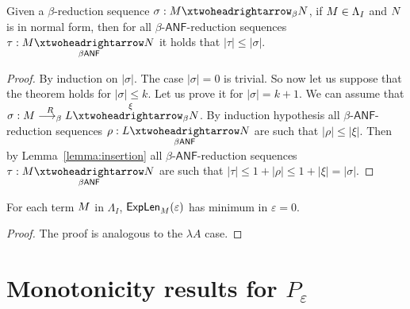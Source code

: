 \begin{theorem}\label{theorem:revstd}
	Given a $\beta$-reduction sequence
	$\sigma:\termone \redbetared{} \termtwo$, if $M\in \Lambda_I$ and $N$ is in normal form, then for all $\beta$-$\mathsf{ANF}$-reduction sequences $\tau:\termone\redbetaredanf{} \termtwo$ it holds that $|\tau|\leq |\sigma|$.
\end{theorem}
\begin{proof}
	By induction on $|\sigma|$. The case $|\sigma|=0$ is trivial. So now let us suppose that the theorem holds for $|\sigma|\leq k$. Let us prove it for $|\sigma|= k+1$. We can assume that $\sigma:\termone \redbetardx{\rdxone}  \termthree \redbetared{\xi}   \termtwo$.
	By induction hypothesis all $\beta$-$\mathsf{ANF}$-reduction sequences $\rho:\termthree \redbetaredanf{} \termtwo$ are such that $|\rho|\leq |\xi|$. Then by Lemma~\ref{lemma:insertion} all $\beta$-$\mathsf{ANF}$-reduction sequences $\tau:\termone\redbetaredanf{} \termtwo$ are such that $|\tau|\leq 1+|\rho|\leq 1+|\xi|=|\sigma|$.
\end{proof}
\begin{corollary}
	For each term $M$ in $\Lambda_{I}$, $\textsf{ExpLen}_{M}(\varepsilon)$ has minimum in $\varepsilon=0$.
\end{corollary}
\begin{LONG}
	\begin{proof}
		The proof is analogous to the $\lambda A$ case.
	\end{proof}
\end{LONG}
\section{Monotonicity results for $P_\varepsilon$}